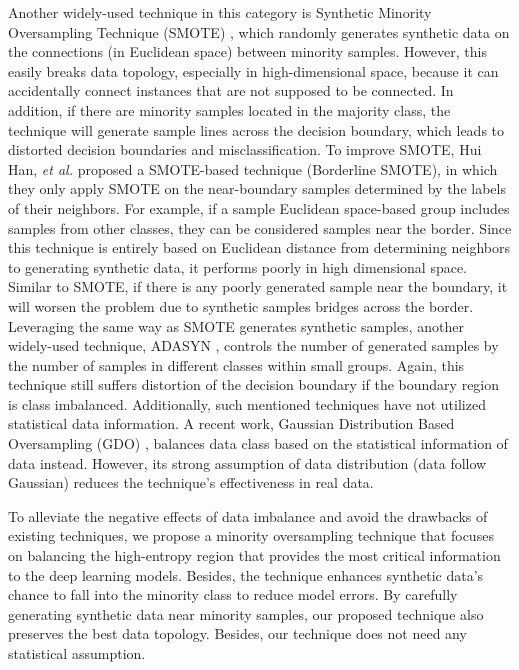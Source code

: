\documentclass[journal]{IEEEtai}
\begin{document}
Another widely-used technique in this category is Synthetic Minority Oversampling Technique (SMOTE) \cite{chawla_smote:_2002}, which randomly generates synthetic data on the connections (in Euclidean space) between minority samples. However, this easily breaks data topology, especially in high-dimensional space, because it can accidentally connect instances that are not supposed to be connected. In addition, if there are minority samples located in the majority class, the technique will generate sample lines across the decision boundary, which leads to distorted decision boundaries and misclassification. To improve SMOTE, Hui Han, \textit{et al.} \cite{bordersmote} proposed a SMOTE-based technique (Borderline SMOTE), in which they only apply SMOTE on the near-boundary samples determined by the labels of their neighbors. For example, if a sample Euclidean space-based group includes samples from other classes, they can be considered samples near the border. Since this technique is entirely based on Euclidean distance from determining neighbors to generating synthetic data, it performs poorly in high dimensional space. Similar to SMOTE, if there is any poorly generated sample near the boundary, it will worsen the problem due to synthetic samples bridges across the border. Leveraging the same way as SMOTE generates synthetic samples, another widely-used technique, ADASYN \cite{ADASYN}, controls the number of generated samples by the number of samples in different classes within small groups. Again, this technique still suffers distortion of the decision boundary if the boundary region is class imbalanced. Additionally, such mentioned techniques have not utilized statistical data information. A recent work, Gaussian Distribution Based Oversampling (GDO) \cite{bib:GDO}, balances data class based on the statistical information of data instead. However, its strong assumption of data distribution (data follow Gaussian) reduces the technique's effectiveness in real data.  

To alleviate the negative effects of data imbalance and avoid the drawbacks of existing techniques, we propose a minority oversampling technique that focuses on balancing the high-entropy region that provides the most critical information to the deep learning models. Besides, the technique enhances synthetic data's chance to fall into the minority class to reduce model errors. By carefully generating synthetic data near minority samples, our proposed technique also preserves the best data topology. Besides, our technique does not need any statistical assumption. 
\end{document}

